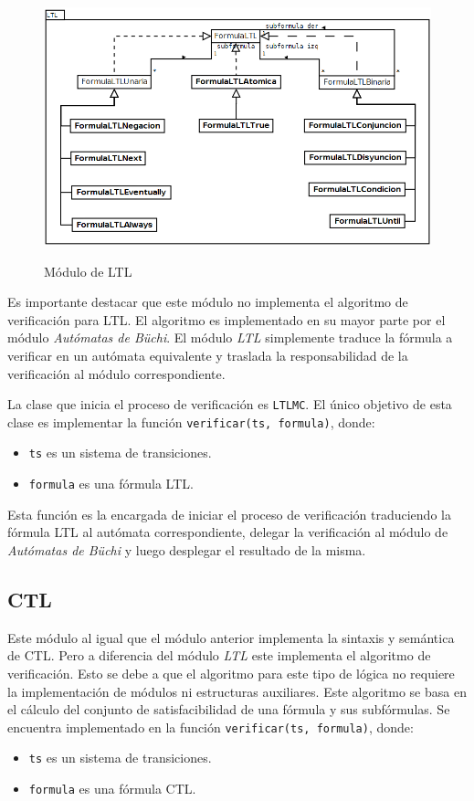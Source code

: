 \begin{figure}[hbtp]
\begin{center}
\caption{Módulo de LTL}
\includegraphics[width=\textwidth]{mc/imagenes/ltl.png}
\label{fig:modulo_LTL}
\end{center}
\end{figure}

Es importante destacar que este módulo no implementa el algoritmo de verificación para LTL.
El algoritmo es implementado en su mayor parte por el módulo \textit{Autómatas de Büchi}.
El módulo \textit{LTL} simplemente traduce la fórmula a verificar en un autómata equivalente
 y traslada la responsabilidad de la verificación al módulo correspondiente.

La clase que inicia el proceso de verificación es \texttt{LTLMC}.
El único objetivo de esta clase es implementar la función \texttt{verificar(ts, formula)},
 donde:
\begin{itemize}
\item \texttt{ts} es un sistema de transiciones.
\item \texttt{formula} es una fórmula LTL.
\end{itemize}

Esta función es la encargada de iniciar el proceso de verificación traduciendo la fórmula LTL
 al autómata correspondiente, delegar la verificación al módulo de \textit{Autómatas de Büchi}
 y luego desplegar el resultado de la misma.

\subsection{CTL}
Este módulo al igual que el módulo anterior implementa la sintaxis y semántica de CTL.
Pero a diferencia del módulo \textit{LTL} este implementa el algoritmo de verificación.
Esto se debe a que el algoritmo para este tipo de lógica no requiere la implementación
 de módulos ni estructuras auxiliares.
Este algoritmo se basa en el cálculo del conjunto de satisfacibilidad de una fórmula
 y sus subfórmulas. Se encuentra implementado en la función \texttt{verificar(ts, formula)},
 donde:
\begin{itemize}
\item \texttt{ts} es un sistema de transiciones.
\item \texttt{formula} es una fórmula CTL.
\end{itemize}

